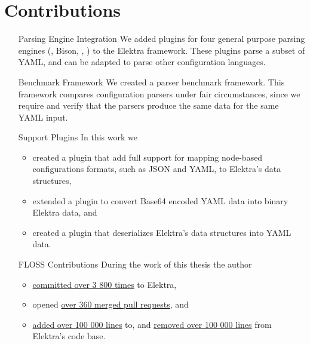 \section{Contributions}

\begin{itemize}[style=multiline, leftmargin=3cm, font=\bfseries]
  \item[Parsing Engine Integration] We added plugins for four general purpose parsing engines (, Bison, , ) to the Elektra framework. These plugins parse a subset of YAML, and can be adapted to parse other configuration languages.

  \item[Benchmark Framework] We created a parser benchmark framework. This framework compares configuration parsers under fair circumstances, since we require and verify that the parsers produce the same data for the same YAML input.

  \item[Support Plugins] In this work we
  \begin{itemize}
    \item created a plugin that add full support for mapping node-based configurations formats, such as JSON and YAML, to Elektra’s data structures,
    \item extended a plugin to convert Base64 encoded YAML data into binary Elektra data, and
    \item created a plugin that deserializes Elektra’s data structures into YAML data.
  \end{itemize}

  \item[\gls{FLOSS} Contributions] During the work of this thesis the author

  \begin{itemize}
    \item \href{https://github.com/ElektraInitiative/libelektra/graphs/contributors?from=2012-04-01&to=2019-09-30&type=c}{committed over 3 800 times} to Elektra,
    \item opened \href{https://github.com/ElektraInitiative/libelektra/pulls?q=is%3Apr+is%3Amerged+author%3Asanssecours}{over 360 merged pull requests}, and
    \item \href{https://github.com/ElektraInitiative/libelektra/graphs/contributors?from=2012-04-01&to=2019-09-30&type=a}{added over 100 000 lines} to, and \href{https://github.com/ElektraInitiative/libelektra/graphs/contributors?from=2012-04-01&to=2019-09-30&type=d}{removed over 100 000 lines} from Elektra’s code base.
  \end{itemize}
\end{itemize}
